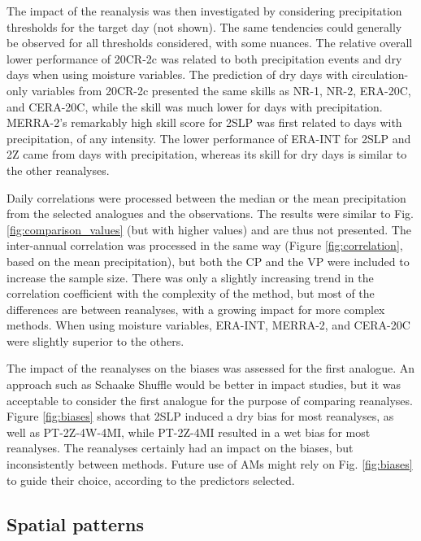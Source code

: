 \documentclass{ametsoc}
\begin{document}
	The impact of the reanalysis was then investigated by considering precipitation thresholds for the target day (not shown). The same tendencies could generally be observed for all thresholds considered, with some nuances. The relative overall lower performance of 20CR-2c was related to both precipitation events and dry days when using moisture variables. The prediction of dry days with circulation-only variables from 20CR-2c presented the same skills as NR-1, NR-2, ERA-20C, and CERA-20C, while the skill was much lower for days with precipitation. MERRA-2's remarkably high skill score for 2SLP was first related to days with precipitation, of any intensity. The lower performance of ERA-INT for 2SLP and 2Z came from days with precipitation, whereas its skill for dry days is similar to the other reanalyses.
	
	Daily correlations were processed between the median or the mean precipitation from the selected analogues and the observations. The results were similar to Fig. \ref{fig:comparison_values} (but with higher values) and are thus not presented. The inter-annual correlation was processed in the same way (Figure \ref{fig:correlation}, based on the mean precipitation), but both the CP and the VP were included to increase the sample size. There was only a slightly increasing trend in the correlation coefficient with the complexity of the method, but most of the differences are between reanalyses, with a growing impact for more complex methods. When using moisture variables, ERA-INT, MERRA-2, and CERA-20C were slightly superior to the others.
	
	The impact of the reanalyses on the biases was assessed for the first analogue. An approach such as Schaake Shuffle \citep{Clark2004a} would be better in impact studies, but it was acceptable to consider the first analogue for the purpose of comparing reanalyses. Figure \ref{fig:biases} shows that 2SLP induced a dry bias for most reanalyses, as well as PT-2Z-4W-4MI, while PT-2Z-4MI resulted in a wet bias for most reanalyses. The reanalyses certainly had an impact on the biases, but inconsistently between methods. Future use of AMs might rely on Fig. \ref{fig:biases} to guide their choice, according to the predictors selected.
	
	
	\subsection{Spatial patterns}
	
\end{document}
